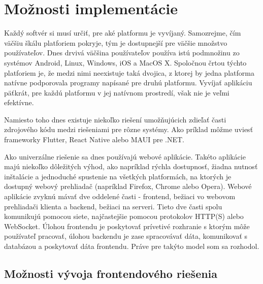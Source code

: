 \chapter{Možnosti implementácie}

\label{kap:moznosti_implementacie}

Každý softvér si musí určiť, pre aké platformu je vyvíjaný. Samozrejme, čím väčšiu škálu platforiem pokryje,
tým je dostupnejší pre väčšie množstvo používateľov. Dnes drvivá väčšina používateľov používa istú podmnožinu
zo systémov Android, Linux, Windows, iOS a MacOS X. Spoločnou črtou týchto platforiem je, že medzi nimi neexistuje taká dvojica,
z ktorej by jedna platforma natívne podporovala programy napísané pre druhú platformu. Vyvíjať aplikáciu päťkrát,
pre každú platformu v jej natívnom prostredí, však nie je veľmi efektívne. 

Namiesto toho dnes existuje niekoľko riešení umožňujúcich zdieľať časti zdrojového kódu medzi riešeniami pre rôzne systémy.
Ako príklad môžme uviesť frameworky Flutter, React Native alebo MAUI pre .NET.

Ako univerzálne riešenie sa dnes používajú webové aplikácie.
Takéto aplikácie majú niekoľko dôležitých výhod, ako napríklad rýchla dostupnosť, žiadna nutnosť inštalácie a jednoduché spustenie
na všetkých platformách, na ktorých je dostupný webový prehliadač (napríklad Firefox, Chrome alebo Opera).
Webové aplikácie zvyknú mávať dve oddelené časti - frontend, bežiaci vo webovom prehliadači klienta a backend,
bežiaci na serveri. Tieto dve časti spolu komunikujú pomocou siete, najčastejšie pomocou protokolov HTTP(S) alebo WebSocket.
Úlohou frontendu je poskytovať prívetivé rozhranie s ktorým môže používateľ pracovať, úlohou backendu je zase spracovávať dáta,
komunikovať s databázou a poskytovať dáta frontendu. Práve pre takýto model som sa rozhodol.

\section{Možnosti vývoja frontendového riešenia}

